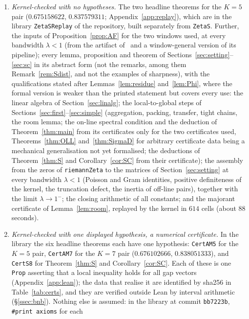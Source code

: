 \begin{enumerate}[label=(\alph*)]
\item \emph{Kernel-checked with no hypotheses.} The two headline theorems for the $K=5$ pair ($0.675158622$, $0.837579311$;
Appendix~\ref{app:replay}), which are in the library \texttt{ZetaSReplay} of the repository, built separately from
\texttt{ZetaS}. Further, the inputs of Proposition~\ref{prop:AF} for the two windows used, at every bandwidth
$\lambda<1$ (from the artifact of~\cite{AF} and a window-general version of its pipeline); every lemma, proposition and theorem of
Sections~\ref{sec:setting}--\ref{sec:sc} in its abstract form (not the remarks, among them Remark~\ref{rem:Sdist}, and not the examples of
sharpness), with the qualifications stated after Lemmas~\ref{lem:residue}
and~\ref{lem:Phi}, where the formal version is weaker than the printed statement but covers every use: the linear algebra of
Section~\ref{sec:linalg}; the local-to-global steps of Sections~\ref{sec:first}--\ref{sec:simple} (aggregation, packing, transfer, tight
chains, the room lemma; the on-line spectral condition and the deduction of Theorem~\ref{thm:main} from its certificates only for the two
certificates used, Theorems~\ref{thm:OLL} and~\ref{thm:SigmaD} for arbitrary certificate data being a mechanical generalisation not yet
formalised; the deductions of Theorem~\ref{thm:S} and Corollary~\ref{cor:SC} from their certificate); the assembly from the
zeros of \texttt{riemannZeta} to the matrices of Section~\ref{sec:setting} at every bandwidth $\lambda<1$ (Poisson and Gram identities, positive
definiteness of the kernel, the truncation defect, the inertia of off-line pairs), together with the limit $\lambda\to1^-$; the closing
arithmetic of all constants; and the majorant certificate of Lemma~\ref{lem:room}, replayed by the kernel in $614$ cells (about $88$
seconds).
\item \emph{Kernel-checked with one displayed hypothesis, a numerical certificate.} In the library the six headline theorems each have one
hypothesis: \texttt{CertAM5} for the $K=5$ pair, \texttt{CertAM7} for the $K=7$ pair ($0.676102666$, $0.838051333$), and \texttt{CertS8} for
Theorem~\ref{thm:S} and Corollary~\ref{cor:SC}. Each of these is one \texttt{Prop} asserting that a local inequality holds for all gap
vectors (Appendix~\ref{app:lean}); the data that realise it are identified by sha256 in Table~\ref{tab:certs}, and they are verified
outside Lean by interval arithmetic (\S\ref{ssec:bnb}). Nothing else is assumed: in the library at commit \texttt{bb7223b}, \texttt{\#print axioms} for each

\end{enumerate}
